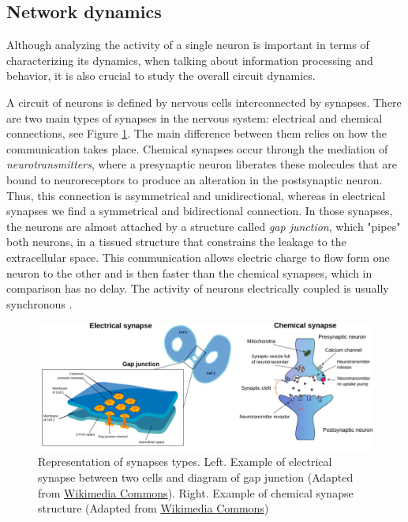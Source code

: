 \subsection{Network dynamics}

Although analyzing the activity of a single neuron is important in terms of characterizing its dynamics, when talking about information processing and behavior, it is also crucial to study the overall circuit dynamics. 

A circuit of neurons is defined by nervous cells interconnected by synapses.
There are two main types of synapses in the nervous system: electrical and chemical connections, see Figure \ref{fig:synapse-types}. The main difference between them relies on how the communication takes place. Chemical synapses occur through the mediation of \textit{neurotransmitters}, where a presynaptic neuron liberates these molecules that are bound to neuroreceptors to produce an alteration in the postsynaptic neuron.  Thus, this connection is asymmetrical and unidirectional, whereas in electrical synapses we find a symmetrical and bidirectional connection. In those synapses, the neurons are almost attached by a structure called \textit{gap junction}, which "pipes" both neurons, in a tissued structure that constrains the leakage to the extracellular space. This communication allows electric charge to flow form one neuron to the other and is then faster than the chemical synapses, which in comparison has no delay. The activity of neurons electrically coupled is usually synchronous \parencite{levitan_neuron_2002}.

\begin{figure}[hbt!]
    \centering
    \includegraphics[width=\linewidth]{img/intro/synapses.pdf}
    \caption{Representation of synapses types. Left. Example of electrical synapse between two cells and diagram of gap junction (Adapted from \href{https://commons.wikimedia.org/wiki/File:Gap_cell_junction-en.svg}{Wikimedia Commons}). Right. Example of chemical synapse structure (Adapted from \href{https://commons.wikimedia.org/wiki/File:Synapse_diag1.svg}{Wikimedia Commons})}
    \label{fig:synapse-types}
\end{figure}

